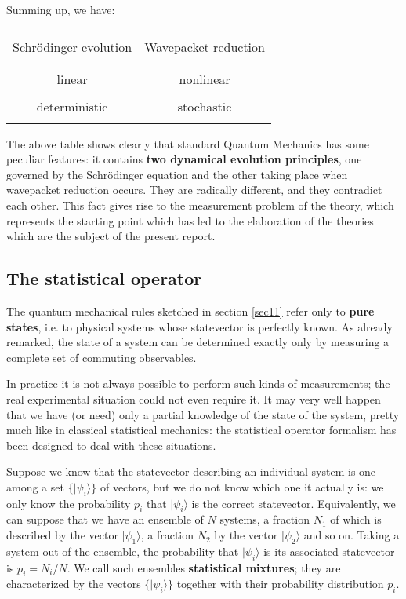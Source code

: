 \documentclass[10pt,a4paper]{article}
\begin{document}
Summing up, we have: \vspace{0.5cm}

\begin{center}
\begin{tabular}{|c|c|} \hline
& \\
Schr\"odinger evolution & Wavepacket reduction \\
& \\ \hline
& \\
linear & nonlinear \\
& \\
deterministic & stochastic \\
& \\ \hline
\end{tabular}
\end{center}
\vspace{0.5cm}

\noindent The above table shows clearly that standard Quantum
Mechanics has some peculiar features: it contains {\bf two
dynamical evolution principles}, one governed by the Schr\"odinger
equation and the other taking place when wavepacket reduction
occurs. They are radically different, and they contradict each
other. This fact gives rise to the measurement problem of the
theory, which represents the starting point which has led to the
elaboration of the theories which are the subject of the present
report.


\subsection{The statistical operator} \label{sec13}

The quantum mechanical rules sketched in section \ref{sec11} refer
only to {\bf pure states}, i.e. to physical systems whose
statevector is perfectly known. As already remarked, the state of
a system can be determined exactly only by measuring a complete
set of commuting observables.

In practice  it is not always possible to perform such kinds of
measurements; the real experimental situation could not even
require it. It may very well happen that we have (or need) only a
partial knowledge of the state of the system, pretty much like in
classical statistical mechanics: the statistical operator
formalism has been designed to deal with these situations.

Suppose we know that the statevector describing an individual
system is one among a set $\{|\psi_{i}\rangle\}$ of vectors, but
we do not know which one it actually is: we only know the
probability $p_{i}$ that $|\psi_{i}\rangle$ is the correct
statevector. Equivalently, we can suppose that we have an ensemble
of $N$ systems, a fraction $N_{1}$ of which is described by the
vector $|\psi_{1}\rangle$, a fraction $N_{2}$ by the vector
$|\psi_{2}\rangle$ and so on. Taking a system out of the ensemble,
the probability that $|\psi_{i}\rangle$ is its associated
statevector is $p_{i} = N_{i}/N$. We call such ensembles {\bf
statistical mixtures}; they are characterized by the vectors
$\{|\psi_{i}\rangle\}$ together with their probability
distribution $p_{i}$.
\end{document}

